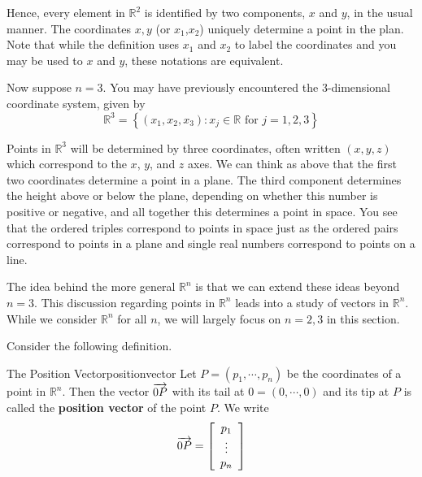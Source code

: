 Hence, every element in $\mathbb{R}^2$ is identified by two
components, $x$ and $y$, in the usual manner. The coordinates $x, y$ (or $x_1$,$x_2$) uniquely determine a point in the plan. Note that while the definition uses $x_1$ and $x_2$ to label the coordinates and you may be used to $x$ and $y$, these notations are equivalent. 

Now suppose $n=3$. You may have previously encountered the $3$-dimensional
coordinate system, given by
\begin{equation*}
\mathbb{R}^{3}=
\left\{ \left( x_{1}, x_{2}, x_{3}\right)
:x_{j}\in \mathbb{R}\text{ for }j=1,2,3 \right\}
\end{equation*}

Points in $\mathbb{R}^3$ will be determined by three
coordinates, often written $\left(x,y,z\right)$ which correspond to the $x$, $y$,
and $z$ axes.  We can think as above that the first two coordinates
determine a point in a plane. The third component determines the
height above or below the plane, depending on whether this number is
positive or negative, and all together this determines a point in
space. You
see that the ordered triples correspond to points in space just as the
ordered pairs correspond to points in a plane and single real numbers
correspond to points on a line.

The idea behind the more general $\mathbb{R}^n$ is that we can extend
these ideas beyond $n = 3.$ This discussion regarding points in $\mathbb{R}^n$ leads into a study of vectors in $\mathbb{R}^n$. While we consider $\mathbb{R}^n$ for all $n$,
we will largely  focus on $n=2,3$ in this section. 

Consider the following definition.

\begin{definition}{The Position Vector}{positionvector}
Let $P=\left( p_{1},\cdots ,p_{n}\right) $ be the coordinates of a
point in $\mathbb{R}^{n}.$ Then the vector $\overrightarrow{0P}$ with its tail at
$0=\left( 0,\cdots ,0\right) $ and its tip at 
$P$ is called the \textbf{position vector }of
  the point $P$. 
We write 
\begin{equation*}
\overrightarrow{0P} = \left[ 
\begin{array}{c}
p_{1} \\
\vdots \\
p_{n}
\end{array} \right]
\end{equation*}
\end{definition}


